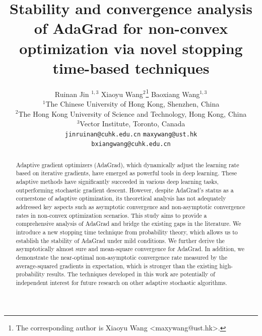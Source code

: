 \documentclass[standalone]{article}
\title{Stability and convergence analysis of AdaGrad for non-convex optimization via novel stopping time-based techniques
}
\author{
  Ruinan Jin $^{1, 3}$ \quad \quad \quad \quad
  Xiaoyu Wang$^{2}$\thanks{The corresponding author is Xiaoyu Wang <maxywang@ust.hk>.} \quad \quad \quad \quad
  Baoxiang Wang$^{1, 3}$ \\
  $^1$The Chinese University of Hong Kong, Shenzhen, China \\
 $^2$The Hong Kong University of Science and Technology, Hong Kong, China \\
  $^3$Vector Institute, Toronto, Canada\\
\texttt{jinruinan@cuhk.edu.cn}  \quad \texttt{maxywang@ust.hk} \\
\quad  \texttt{bxiangwang@cuhk.edu.cn}
}
\begin{document}



\maketitle





\begin{abstract}
Adaptive gradient optimizers (AdaGrad), which dynamically adjust the learning rate based on iterative gradients, have emerged as powerful tools in deep learning. These adaptive methods have significantly succeeded in various deep learning tasks, outperforming stochastic gradient descent. However, despite AdaGrad's status as a cornerstone of adaptive optimization, its theoretical analysis has not adequately addressed key aspects such as asymptotic convergence and non-asymptotic convergence rates in non-convex optimization scenarios. This study aims to provide a comprehensive analysis of AdaGrad and bridge the existing gaps in the literature. We introduce a new stopping time technique from probability theory, which allows us to establish the stability of AdaGrad under mild conditions. We further derive the asymptotically almost sure and mean-square convergence for AdaGrad. In addition, we demonstrate the near-optimal non-asymptotic convergence rate measured by the average-squared gradients in expectation, which is stronger than the existing high-probability results. The techniques developed in this work are potentially of independent interest for future research on other adaptive stochastic algorithms.

\end{abstract}
\end{document}
